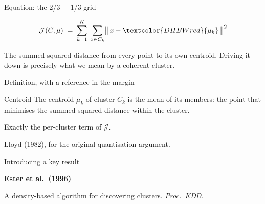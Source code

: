 \documentclass[aspectratio=169]{beamer}
\begin{document}
\begin{frame}{Equation: the 2/3 + 1/3 grid}
  \begin{withmargin}
    \begin{tdmain}
      \vspace*{1.2em}
      \[
        \mathcal{J}(C,\mu)
          \;=\; \sum_{k=1}^{K}\;\sum_{x \in C_k}
                \bigl\lVert\, x - \textcolor{DHBWred}{\mu_k}\,\bigr\rVert^{2}
      \]
    \end{tdmain}
    \begin{tdmargin}
      The summed squared distance from every point to \textcolor{DHBWred}{its own
      centroid}. Driving it down is precisely what we mean by a coherent cluster.
    \end{tdmargin}
  \end{withmargin}
\end{frame}

\begin{frame}{Definition, with a reference in the margin}
  \begin{withmargin}
    \begin{tdmain}
      \begin{tddef}{Centroid}
        The centroid $\mu_k$ of cluster $C_k$ is the mean of its members:
        the point that minimises the summed squared distance within the cluster.
      \end{tddef}
    \end{tdmain}
    \begin{tdmargin}
      Exactly the per-cluster term of $\mathcal{J}$.
      \par\smallskip
      Lloyd (1982), for the original quantisation argument.
    \end{tdmargin}
  \end{withmargin}
\end{frame}

\begin{frame}{Introducing a key result}
  \begin{withmargin}
    \begin{tdmargin}
      \textbf{Ester et al.\ (1996)}\par\smallskip
      A density-based algorithm for discovering clusters. \textit{Proc.\ KDD}.
    \end{tdmargin}
  \end{withmargin}
\end{frame}
\end{document}
